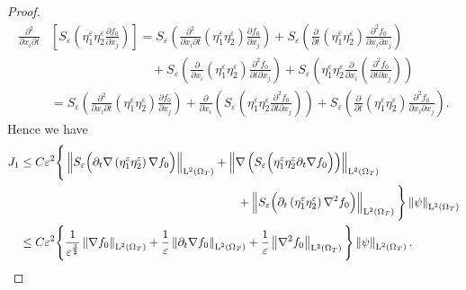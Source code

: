 \documentclass[preprint, 12pt]{amsart}
\numberwithin{equation}{section}
\numberwithin{equation}{section}
\newcommand{\eps}{\varepsilon}
\begin{document}
\begin{proof}
\begin{equation*}
\begin{aligned}
\frac{\partial^2}{\partial x_i\partial t} & \left[S_\eps \left(\eta_1^\eps \eta_2^\eps \frac{\partial f_0}{\partial x_j}\right)\right] 
= S_\eps \left(\frac{\partial^2}{\partial x_i\partial t}\left(\eta_1^\eps \eta_2^\eps\right) \frac{\partial f_0}{\partial x_j}\right)
+ S_\eps \left(\frac{\partial}{\partial t}\left(\eta_1^\eps \eta_2^\eps\right) \frac{\partial^2 f_0}{\partial x_i \partial x_j}\right)
\\
& \qquad \qquad \qquad \qquad + S_\eps \left(\frac{\partial}{\partial x_i}\left(\eta_1^\eps \eta_2^\eps\right) \frac{\partial^2 f_0}{\partial t \partial x_j}\right) 
+ S_\eps \left( \eta_1^\eps \eta_2^\eps \frac{\partial}{\partial x_i} \left(\frac{\partial^2 f_0}{\partial t \partial x_j}\right)\right)
\\
& = S_\eps \left(\frac{\partial^2}{\partial x_i\partial t}\left(\eta_1^\eps \eta_2^\eps\right) \frac{\partial f_0}{\partial x_j}\right)
+ \frac{\partial}{\partial x_i} \left( S_\eps \left( \eta_1^\eps \eta_2^\eps \frac{\partial^2 f_0}{\partial t \partial x_j}\right)\right)
+ S_\eps \left(\frac{\partial}{\partial t}\left(\eta_1^\eps \eta_2^\eps\right) \frac{\partial^2 f_0}{\partial x_i \partial x_j}\right).
\end{aligned}
\end{equation*}
Hence we have
\begin{equation*}
\begin{aligned}
J_1 & \le C \eps^2 \Bigg\{
\left\Vert S_\eps \Big(\partial_t\nabla \left(\eta_1^\eps \eta_2^\eps\right) \nabla f_0 \Big)\right\Vert_{\mathrm L^2(\Omega_T)}
+ \left\Vert \nabla \left(S_\eps \Big(\eta_1^\eps \eta_2^\eps \partial_t\nabla f_0 \Big)\right)\right\Vert_{\mathrm L^2(\Omega_T)}
\\
& \hspace{6.5 cm}+ \left\Vert S_\eps \Big( \partial_t \left(\eta_1^\eps \eta_2^\eps\right) \nabla^2 f_0 \Big)\right\Vert_{\mathrm L^2(\Omega_T)}
\Bigg\} \left\Vert \psi \right\Vert_{\mathrm L^2(\Omega_T)}
\\
& \le C \eps^2 \Bigg\{ \frac{1}{\eps^{\frac32}} \left\Vert \nabla f_0 \right\Vert_{\mathrm L^2(\Omega_T)}
+ \frac{1}{\eps} \left\Vert \partial_t\nabla f_0 \right\Vert_{\mathrm L^2(\Omega_T)}
+ \frac{1}{\eps} \left\Vert \nabla^2 f_0 \right\Vert_{\mathrm L^2(\Omega_T)}
\Bigg\} \left\Vert \psi \right\Vert_{\mathrm L^2(\Omega_T)}.
\end{aligned}
\end{equation*}

\end{proof}
\end{document}
